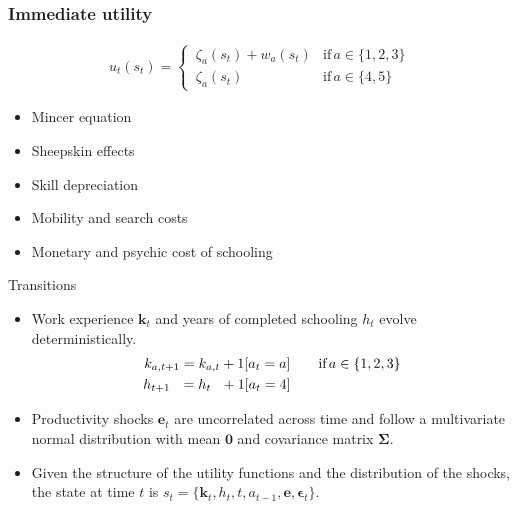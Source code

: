 \begin{frame}\frametitle{Immediate utility}\vspace{0.3cm}

  \begin{multicols}{2}

  \begin{align*}
  u_t(s_t) =
  \begin{cases}
      \,\zeta_a(s_t)  + w_a(s_t)   & \text{if}\, a \in \{1, 2, 3\}  \\[0.2cm]
      \,\zeta_a(s_t)                 &  \text{if}\, a \in \{4, 5\}
  \end{cases}
  \end{align*}

  \columnbreak


  \vspace{0.3cm}
  \begin{itemize}\setlength\itemsep{1em}
     \item Mincer equation
     \item Sheepskin effects
     \item Skill depreciation
     \item Mobility and search costs
     \item Monetary and psychic cost of schooling
  \end{itemize}

\end{multicols}

\end{frame}
\begin{frame}{Transitions}\vspace{0.25cm}

\begin{itemize}\setlength\itemsep{1em}
  \item Work experience $\bm{k}_t$  and years of completed schooling $h_t$ evolve deterministically.
  \begin{align*}
  k_{a,t+1} = k_{a,t} + 1[a_t = a]  &\qquad \text{if}\, a \in \{1, 2, 3\} \\
  h_{t + 1\phantom{,a}} = h_{t\phantom{,a}} +   1[a_t = 4]  &\qquad
  \end{align*}


  \item Productivity shocks $\bm{e}_t$ are uncorrelated across time and follow a multivariate normal distribution with mean $\bm{0}$ and covariance matrix $\bm{\Sigma}$.

  \item Given the structure of the utility functions and the distribution of the shocks, the state at time $t$ is $s_t = \{\bm{k}_t, h_t, t, a_{t -1}, \bm{e},\bm{\epsilon}_t\}$.
\end{itemize}

\end{frame}

